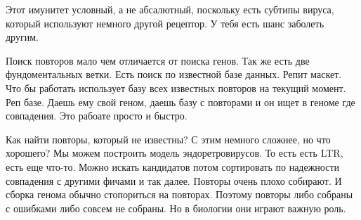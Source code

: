 Этот имунитет условный, а не абсалютный, поскольку есть субтипы вируса, который используют 
немного другой рецептор. У тебя есть шанс заболеть другим. 

Поиск повторов мало чем отличается от поиска генов. Так же есть две фундоментальных ветки. 
Есть поиск по известной базе данных. Репит маскет. Что бы работать использует базу 
всех известных повторов на текущий момент. Реп базе. Даешь ему свой геном, даешь 
базу с повторами и он ищет в геноме где совпадения. Это рабоате просто и быстро. 

Как найти повторы, который не известны? С этим немного сложнее, но что хорошего? 
Мы можем построить модель эндоретровирусов. То есть есть LTR, есть еще что-то. Можно 
искать кандидатов потом сортировать по надежности совпадения с другими фичами и так далее. 
Повторы очень плохо собирают. И сборка генома обычно стопориться на повторах. Поэтому 
повторы либо собраны с ошибками либо совсем не собраны. Но в биологии они играют важную роль. 


